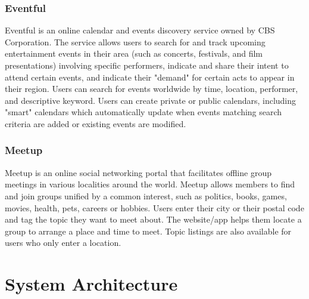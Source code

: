 \documentclass[12pt,letterpaper]{article}
\begin{document}
\subsubsection{Eventful}
Eventful is an online calendar and events discovery service owned by CBS Corporation. The service allows users to search for and track upcoming entertainment events in their area (such as concerts, festivals, and film presentations) involving specific performers, indicate and share their intent to attend certain events, and indicate their "demand" for certain acts to appear in their region. Users can search for events worldwide by time, location, performer, and descriptive keyword. Users can create private or public calendars, including "smart" calendars which automatically update when events matching search criteria are added or existing events are modified.

\subsubsection{Meetup}
Meetup is an online social networking portal that facilitates offline group meetings in various localities around the world. Meetup allows members to find and join groups unified by a common interest, such as politics, books, games, movies, health, pets, careers or hobbies. Users enter their city or their postal code and tag the topic they want to meet about. The website/app helps them locate a group to arrange a place and time to meet. Topic listings are also available for users who only enter a location. \cite{meetupapi}


\section{System Architecture}
\end{document}
